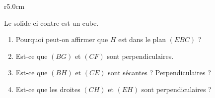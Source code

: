 
\begin{exercice}\label{exoSeconde-0087}

\begin{wrapfigure}{r}{5.0cm}
    \vspace{-1cm}
                \centering
                    
                \end{wrapfigure}
            Le solide ci-contre est un cube. 
        \begin{enumerate}
            \item
                Pourquoi peut-on affirmer que \( H\) est dans le plan \( (EBC)\) ?
            \item
                Est-ce que \( (BG)\) et \( (CF)\) sont perpendiculaires.
    \item
                Est-ce que \( (BH)\) et \( (CE)\) sont sécantes ? Perpendiculaires ?
    \item
        Est-ce que les droites \( (CH)\) et \( (EH)\) sont perpendiculaires ?
        \end{enumerate}

\end{exercice}
